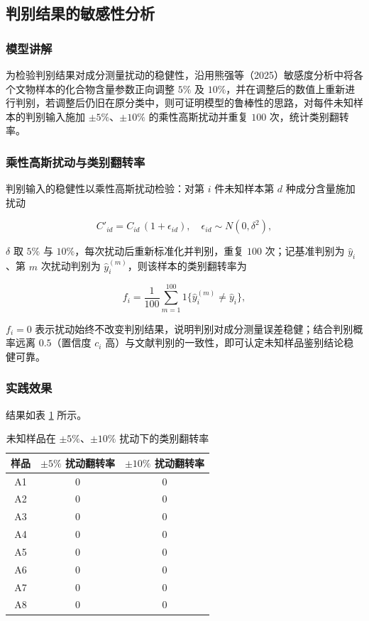 \documentclass{ctexart}
\begin{document}
\subsection{判别结果的敏感性分析}

\subsubsection{模型讲解}

为检验判别结果对成分测量扰动的稳健性，沿用熊强等（2025）敏感度分析中将各个文物样本的化合物含量参数正向调整 $5\%$ 及 $10\%$，并在调整后的数值上重新进行判别，若调整后仍旧在原分类中，则可证明模型的鲁棒性的思路，对每件未知样本的判别输入施加 $\pm5\%$、$\pm10\%$ 的乘性高斯扰动并重复 $100$ 次，统计类别翻转率。


\subsubsection{乘性高斯扰动与类别翻转率}

判别输入的稳健性以乘性高斯扰动检验：对第 $i$ 件未知样本第 $d$ 种成分含量施加扰动

\begin{equation*}
C'_{id}=C_{id}\,(1+\epsilon_{id}),\quad \epsilon_{id}\sim N(0,\delta^{2}),
\end{equation*}

$\delta$ 取 $5\%$ 与 $10\%$，每次扰动后重新标准化并判别，重复 $100$ 次；记基准判别为 $\widehat y_i$、第 $m$ 次扰动判别为 $\widehat y_i^{(m)}$，则该样本的类别翻转率为

\begin{equation*}
f_i=\frac{1}{100}\sum_{m=1}^{100}\mathrm{1}\big\{\widehat y_i^{(m)}\neq \widehat y_i\big\},
\end{equation*}

$f_i=0$ 表示扰动始终不改变判别结果，说明判别对成分测量误差稳健；结合判别概率远离 $0.5$（置信度 $c_i$ 高）与文献判别的一致性，即可认定未知样品鉴别结论稳健可靠。

\subsubsection{实践效果}

结果如表 \ref{tab:flip} 所示。

\begin{table}[htbp]
\centering
\caption{未知样品在 $\pm5\%$、$\pm10\%$ 扰动下的类别翻转率}
\label{tab:flip}
\begin{tabular}{c|c|c}
\hline
样品 & $\pm5\%$ 扰动翻转率 & $\pm10\%$ 扰动翻转率 \\
\hline
A1 & $0$ & $0$ \\
A2 & $0$ & $0$ \\
A3 & $0$ & $0$ \\
A4 & $0$ & $0$ \\
A5 & $0$ & $0$ \\
A6 & $0$ & $0$ \\
A7 & $0$ & $0$ \\
A8 & $0$ & $0$ \\
\hline
\end{tabular}
\end{table}
\end{document}

